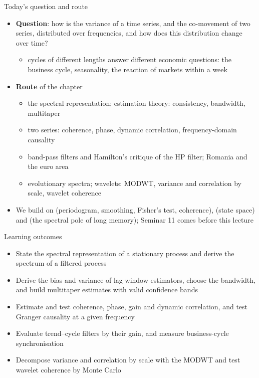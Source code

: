 \begin{frame}{Today's question and route}
\itemsize{\small}
\begin{itemize}
    \item \textbf{Question}: how is the variance of a time series, and the co-movement of two series, distributed over frequencies, and how does this distribution change over time?
    \begin{itemize}
        \item cycles of different lengths answer different economic questions: the business cycle, seasonality, the reaction of markets within a week
    \end{itemize}
    \item \textbf{Route} of the chapter
    \begin{itemize}
        \item the spectral representation; estimation theory: consistency, bandwidth, multitaper
        \item two series: coherence, phase, dynamic correlation, frequency-domain causality
        \item band-pass filters and Hamilton's critique of the HP filter; Romania and the euro area
        \item evolutionary spectra; wavelets: MODWT, variance and correlation by scale, wavelet coherence
    \end{itemize}
    \item We build on  (periodogram, smoothing, Fisher's test, coherence),  (state space) and  (the spectral pole of long memory); Seminar 11 comes before this lecture
\end{itemize}
\end{frame}

\begin{frame}{Learning outcomes}
\itemsize{\small}
\begin{itemize}
    \item State the spectral representation of a stationary process and derive the spectrum of a filtered process
    \item Derive the bias and variance of lag-window estimators, choose the bandwidth, and build multitaper estimates with valid confidence bands
    \item Estimate and test coherence, phase, gain and dynamic correlation, and test Granger causality at a given frequency
    \item Evaluate trend--cycle filters by their gain, and measure business-cycle synchronisation
    \item Decompose variance and correlation by scale with the MODWT and test wavelet coherence by Monte Carlo
\end{itemize}
\end{frame}

